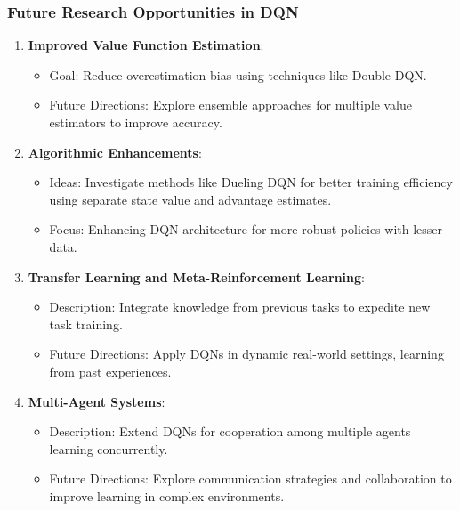 \documentclass{beamer}
\begin{document}
\begin{frame}[fragile]
    \frametitle{Future Research Opportunities in DQN}
    \begin{enumerate}
        \item \textbf{Improved Value Function Estimation}:
        \begin{itemize}
            \item Goal: Reduce overestimation bias using techniques like Double DQN.
            \item Future Directions: Explore ensemble approaches for multiple value estimators to improve accuracy.
        \end{itemize}

        \item \textbf{Algorithmic Enhancements}:
        \begin{itemize}
            \item Ideas: Investigate methods like Dueling DQN for better training efficiency using separate state value and advantage estimates.
            \item Focus: Enhancing DQN architecture for more robust policies with lesser data.
        \end{itemize}

        \item \textbf{Transfer Learning and Meta-Reinforcement Learning}:
        \begin{itemize}
            \item Description: Integrate knowledge from previous tasks to expedite new task training.
            \item Future Directions: Apply DQNs in dynamic real-world settings, learning from past experiences.
        \end{itemize}

        \item \textbf{Multi-Agent Systems}:
        \begin{itemize}
            \item Description: Extend DQNs for cooperation among multiple agents learning concurrently.
            \item Future Directions: Explore communication strategies and collaboration to improve learning in complex environments.
        \end{itemize}
    \end{enumerate}
\end{frame}
\end{document}
